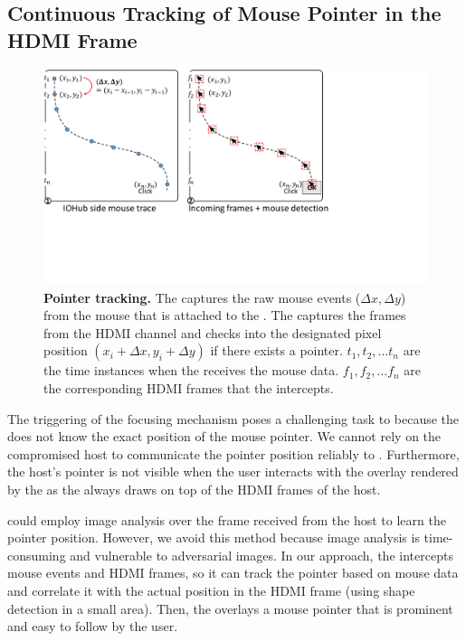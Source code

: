 \subsection{Continuous Tracking of Mouse Pointer in the HDMI Frame}
\label{sec:systemDesign:analysis}


\begin{figure}[t]
\centering
\includegraphics[trim={0 5.2cm 8cm 0}, clip, width=0.9\linewidth]{chapters/ProtectIOn/images/mouseAnalysis.pdf}
\caption[\name Pointer tracking]{\textbf{Pointer tracking.} \one The \device captures the raw mouse events ($\Delta x, \Delta y$) from the mouse that is attached to the \device. \two The \device captures the frames from the HDMI channel and checks into the designated pixel position $(x_i + \Delta x, y_i + \Delta y)$ if there exists a pointer. $t_1, t_2,\ldots t_n$ are the time instances when the \device receives the mouse data. $f_1, f_2,\ldots f_n$ are the corresponding HDMI frames that the \device intercepts.}
\spacesave
\label{fig:mouseAnalysis}
\centering
\end{figure}


The triggering of the focusing mechanism poses a challenging task to \name because the \device does not know the exact position of the mouse pointer. We cannot rely on the compromised host to communicate the pointer position reliably to \device. Furthermore, the host's pointer is not visible when the user interacts with the overlay rendered by the \device as the \device always draws on top of the HDMI frames of the host. 

\device could employ image analysis over the frame received from the host to learn the pointer position. However, we avoid this method because image analysis is time-consuming and vulnerable to adversarial images. In our approach, the \device intercepts mouse events and HDMI frames, so it can track the pointer based on mouse data and correlate it with the actual position in the HDMI frame (using shape detection in a small area). Then, the \device overlays a mouse pointer that is prominent and easy to follow by the user. 

